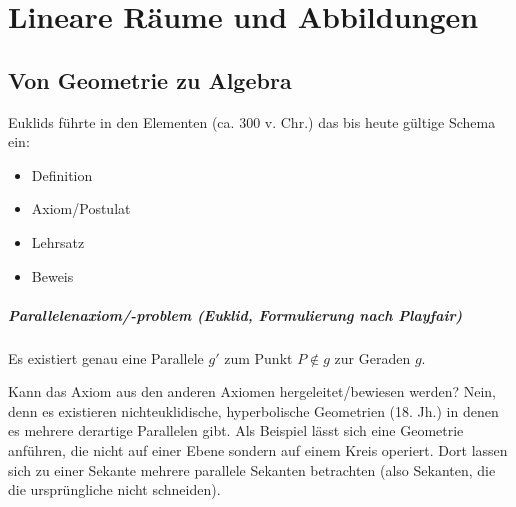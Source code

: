 \chapter{Lineare Räume und Abbildungen}
\section{Von Geometrie zu Algebra}
	Euklids führte in den \glqq Elementen\grqq{} (ca. 300 v. Chr.) das bis heute gültige Schema ein:
	\begin{itemize}
		\item Definition
		\item Axiom/Postulat
		\item Lehrsatz
		\item Beweis
	\end{itemize}

\paragraph{Parallelenaxiom/-problem (Euklid, Formulierung nach Playfair)}
	Es existiert genau eine Parallele $ g' $ zum Punkt $ P \notin g $ zur Geraden $ g $.

	Kann das Axiom aus den anderen Axiomen hergeleitet/bewiesen werden? Nein, denn es existieren nichteuklidische, hyperbolische Geometrien (18. Jh.) in denen es mehrere derartige Parallelen gibt. Als Beispiel lässt sich eine Geometrie anführen, die nicht auf einer Ebene sondern auf einem Kreis operiert. Dort lassen sich zu einer Sekante mehrere parallele Sekanten betrachten (also Sekanten, die die ursprüngliche nicht schneiden).

